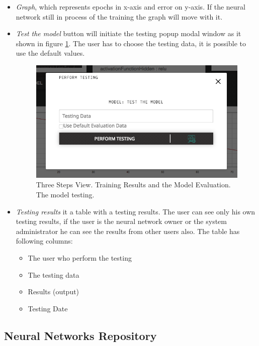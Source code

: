 \begin{itemize}
\item \emph{Graph}, which represents epochs in  x-axis and error on y-axis. If the neural network still in process of the training the graph will move with it. 
\item \emph{Test the model} button will initiate the testing popup modal window as it shown in figure \ref{fig:model_testing}. The user has to choose the testing data, it is possible to use the default values.

\begin{figure}[htbp]
\begin{center}
  \includegraphics[scale=0.5]{components/5/img/model_testing.png}
  \caption{Three Steps View. Training Results and the Model Evaluation. The model testing.}
  \label{fig:model_testing}
\end{center}
\end{figure}

\item \emph{Testing results} it a table with a testing results. The user can see only his own testing results, if the user is the neural network owner or the system administrator he can see the results from other users also. The table has following columns:
\begin{itemize}
\item The user who perform the testing 
\item The testing data
\item Results (output)
\item Testing Date
\end{itemize}


\end{itemize}





\subsection{Neural Networks Repository}\label{Neural Networks Repository}

